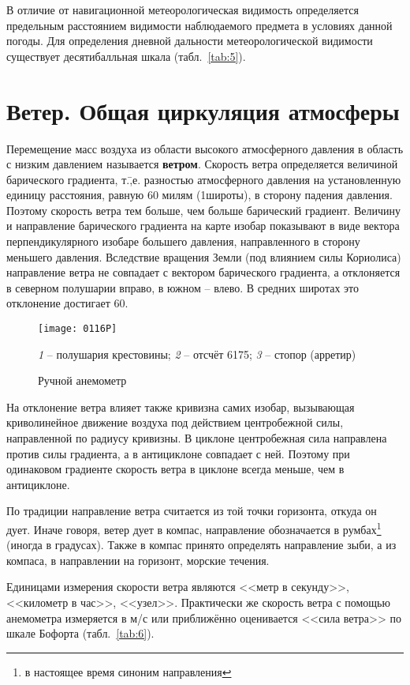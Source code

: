 В отличие от навигационной метеорологическая видимость определяется
предельным расстоянием видимости наблюдаемого предмета в условиях
данной погоды. Для определения дневной дальности метеорологической
видимости существует десятибалльная шкала (табл.~\ref{tab:5}).

\section{Ветер. Общая циркуляция атмосферы}

Перемещение масс воздуха из области высокого атмосферного давления в
область с низким давлением называется
\textbf{ветром}. Скорость ветра определяется величиной
барического градиента, т.\=,е. разностью атмосферного давления на
установленную единицу расстояния, равную 60 милям (1\gr широты), в
сторону падения давления. Поэтому скорость ветра тем больше, чем
больше барический градиент. Величину и направление барического
градиента на карте изобар показывают в виде вектора перпендикулярного
изобаре большего давления, направленного в сторону меньшего
давления. Вследствие вращения Земли (под влиянием силы Кориолиса)
направление ветра не совпадает с вектором барического градиента, а
отклоняется в северном полушарии вправо, в южном \--- влево. В средних
широтах это отклонение достигает 60\gr.

\begin{figure}[!htb]
  \centering{}
  \texttt{[image: 0116P]}
  \caption{Ручной анемометр}
  \label{fig:116}
  \small
  \centering{}
  \textit{1} \--- полушария крестовины; \textit{2} \--- отсчёт 6175; \textit{3} \--- стопор (арретир)
\end{figure}

На отклонение ветра влияет также кривизна самих изобар, вызывающая
криволинейное движение воздуха под действием центробежной силы,
направленной по радиусу кривизны. В циклоне центробежная сила
направлена против силы градиента, а в антициклоне совпадает с
ней. Поэтому при одинаковом градиенте скорость ветра в циклоне всегда
меньше, чем в антициклоне.

По традиции направление ветра считается из той точки горизонта, откуда
он дует. Иначе говоря, ветер дует в компас, направление обозначается в
румбах\footnote{в настоящее время синоним направления} (иногда в
градусах). Также в компас принято определять направление зыби, а из
компаса, в направлении на горизонт, морские течения.

Единицами измерения скорости ветра являются <<метр в секунду>>,
<<километр в час>>, <<узел>>. Практически же скорость ветра с помощью
анемометра измеряется в м/с или приближённо оценивается <<сила ветра>>
по шкале Бофорта (табл.~\ref{tab:6}).

